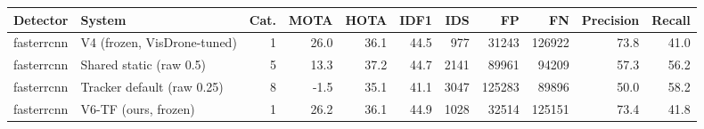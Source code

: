 \begin{tabular}{llrrrrrrrrr}
\toprule
Detector & System & Cat. & MOTA & HOTA & IDF1 & IDS & FP & FN & Precision & Recall \\
\midrule
fasterrcnn & V4 (frozen, VisDrone-tuned) & 1 & 26.0 & 36.1 & 44.5 & 977 & 31243 & 126922 & 73.8 & 41.0 \\
fasterrcnn & Shared static (raw 0.5) & 5 & 13.3 & 37.2 & 44.7 & 2141 & 89961 & 94209 & 57.3 & 56.2 \\
fasterrcnn & Tracker default (raw 0.25) & 8 & -1.5 & 35.1 & 41.1 & 3047 & 125283 & 89896 & 50.0 & 58.2 \\
fasterrcnn & V6-TF (ours, frozen) & 1 & 26.2 & 36.1 & 44.9 & 1028 & 32514 & 125151 & 73.4 & 41.8 \\
\bottomrule
\end{tabular}
